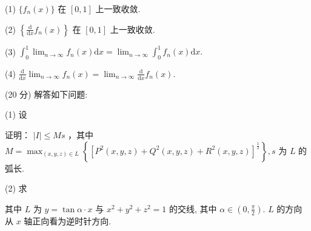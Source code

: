 (1) $\{f_n(x)\}$ 在 $[0,1]$ 上一致收敛.\par
(2) $\left\{\frac{\mathrm{d}}{\mathrm{d}x} f_n(x)\right\}$ 在 $[0,1]$ 上一致收敛.\par
(3) $\int_0^1\lim_{n\to \infty}f_n(x)\mathrm{d}x = \lim_{n\to \infty}\int_0^1 f_n(x)\mathrm{d}x.$\par
(4) $\frac{\mathrm{d}}{\mathrm{d}x}\lim_{n\to \infty}f_n(x) = \lim_{n\to \infty}\frac{\mathrm{d}}{\mathrm{d}x} f_n(x).$\par
(20 分) 解答如下问题:\par
\par{}
(1) 设\par
\nopagebreak[4]
证明： $|I|\leq Ms$ ，其中 $M = \max_{(x,y,z)\in L}\left\{[P^2 (x,y,z) + Q^2 (x,y,z) + R^2 (x,y,z)]^{\frac{1}{2}}\right\} ,s$ 为 $L$ 的弧长.\par
\par{}
(2) 求\par
\nopagebreak[4]
其中 $L$ 为 $y = \tan \alpha \cdot x$ 与 $x^{2} + y^{2} + z^{2} = 1$ 的交线, 其中 $\alpha \in \left(0, \frac{\pi}{2}\right)$. $L$ 的方向从 $x$ 轴正向看为逆时针方向.\par
